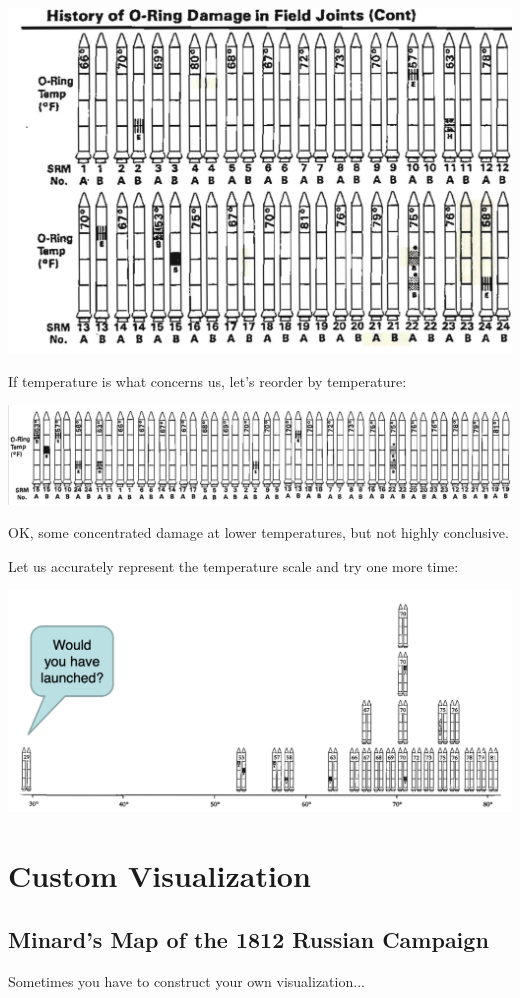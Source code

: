 \documentclass[11pt]{article}
\theoremstyle{definition}
\begin{document}
\includegraphics[width=\textwidth]{34.png}

If temperature is what concerns us, let’s reorder by
temperature:

\includegraphics[width=\textwidth]{35.png}

OK, some
concentrated
damage at lower
temperatures, but not
highly conclusive.

Let us accurately represent the temperature scale and
try one more time:

\includegraphics[width=\textwidth]{36.png}

\section{Custom Visualization}

\subsection{Minard’s Map of the 1812 Russian Campaign}
Sometimes you have to construct your own visualization...
\end{document}

